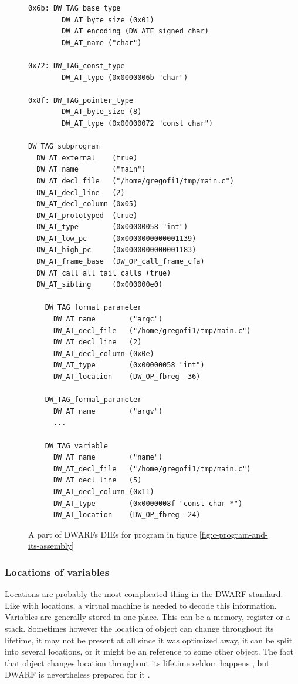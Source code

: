 \begin{figure}
    \begin{lstlisting}
0x6b: DW_TAG_base_type
        DW_AT_byte_size (0x01)
        DW_AT_encoding (DW_ATE_signed_char)
        DW_AT_name ("char")

0x72: DW_TAG_const_type
        DW_AT_type (0x0000006b "char")

0x8f: DW_TAG_pointer_type
        DW_AT_byte_size	(8)
        DW_AT_type (0x00000072 "const char")

DW_TAG_subprogram
  DW_AT_external	(true)
  DW_AT_name	    ("main")
  DW_AT_decl_file	("/home/gregofi1/tmp/main.c")
  DW_AT_decl_line	(2)
  DW_AT_decl_column	(0x05)
  DW_AT_prototyped	(true)
  DW_AT_type        (0x00000058 "int")
  DW_AT_low_pc      (0x0000000000001139)
  DW_AT_high_pc	    (0x0000000000001183)
  DW_AT_frame_base	(DW_OP_call_frame_cfa)
  DW_AT_call_all_tail_calls	(true)
  DW_AT_sibling	    (0x000000e0)

    DW_TAG_formal_parameter
      DW_AT_name	    ("argc")
      DW_AT_decl_file	("/home/gregofi1/tmp/main.c")
      DW_AT_decl_line	(2)
      DW_AT_decl_column	(0x0e)
      DW_AT_type	    (0x00000058 "int")
      DW_AT_location	(DW_OP_fbreg -36)

    DW_TAG_formal_parameter
      DW_AT_name	    ("argv")
      ...

    DW_TAG_variable
      DW_AT_name	    ("name")
      DW_AT_decl_file	("/home/gregofi1/tmp/main.c")
      DW_AT_decl_line	(5)
      DW_AT_decl_column	(0x11)
      DW_AT_type	    (0x0000008f "const char *")
      DW_AT_location	(DW_OP_fbreg -24)
    \end{lstlisting}
    \caption{A part of DWARFs DIEs for program in figure \ref{fig:c-program-and-its-assembly}}
    \label{fig:dwarf-die}
\end{figure}

\subsubsection{Locations of variables}
Locations are probably the most complicated thing in the DWARF standard. Like
with locations, a virtual machine is needed to decode this information.
Variables are generally stored in one place. This can be a memory, register or
a stack. Sometimes however the location of object can change throughout its
lifetime, it may not be present at all since it was optimized away, it can be
split into several locations, or it might be an reference to some other object.
The fact that object changes location throughout its lifetime seldom happens
\cite{dwarf-intro}, but DWARF is nevertheless prepared for it \cite{dwarf}.


